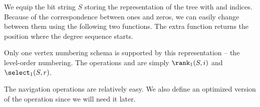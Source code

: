 We equip the bit string $S$ storing the representation of the tree with \rank{} and \select{} indices.
Because of the correspondence between ones and zeros, we can easily change between them using the following two functions.
The extra function \toBeginning{} returns the position where the degree sequence starts.

\begin{algorithm}
\begin{algorithmic}
	\State {}
\EndFunction
\end{algorithmic}
\end{algorithm}

\begin{algorithm}
\begin{algorithmic}
	\State {}
\EndFunction
\end{algorithmic}
\end{algorithm}

\begin{algorithm}
\begin{algorithmic}
	\State {}
\EndFunction
\end{algorithmic}
\end{algorithm}

Only one vertex numbering schema is supported by this representation -- the level-order numbering.
The operations \loRank{} and \loSelect{} are simply $\rank_1(S, i)$ and $\select_1(S, r)$.


The navigation operations are relatively easy.
We also define an optimized version of the operation \childLast since we will need it later.

\begin{algorithm}
\begin{algorithmic}
	\State {}
\EndFunction
\end{algorithmic}
\end{algorithm}

\begin{algorithm}
\begin{algorithmic}
	\State {} 
\EndFunction
\end{algorithmic}
\end{algorithm}

